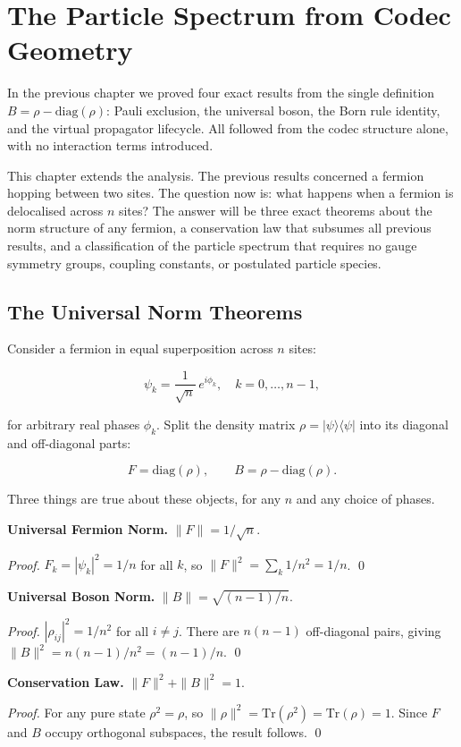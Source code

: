 \chapter{The Particle Spectrum from Codec Geometry}

In the previous chapter we proved four exact results from the single
definition $B = \rho - \mathrm{diag}(\rho)$: Pauli exclusion, the
universal boson, the Born rule identity, and the virtual propagator
lifecycle. All followed from the codec structure alone, with no
interaction terms introduced.

This chapter extends the analysis. The previous results concerned a
fermion hopping between two sites. The question now is: what happens
when a fermion is delocalised across $n$ sites? The answer will be
three exact theorems about the norm structure of any fermion, a
conservation law that subsumes all previous results, and a
classification of the particle spectrum that requires no gauge
symmetry groups, coupling constants, or postulated particle species.

\section{The Universal Norm Theorems}

Consider a fermion in equal superposition across $n$ sites:

\[
\psi_k = \frac{1}{\sqrt{n}}\,e^{i\phi_k}, \quad k = 0, \ldots, n-1,
\]

for arbitrary real phases $\phi_k$. Split the density matrix
$\rho = |\psi\rangle\langle\psi|$ into its diagonal and off-diagonal
parts:

\[
F = \mathrm{diag}(\rho), \qquad B = \rho - \mathrm{diag}(\rho).
\]

Three things are true about these objects, for any $n$ and any choice
of phases.

\textbf{Universal Fermion Norm.} $\|F\| = 1/\sqrt{n}$.

\textit{Proof.} $F_k = |\psi_k|^2 = 1/n$ for all $k$, so $\|F\|^2 =
\sum_k 1/n^2 = 1/n$. \qed

\textbf{Universal Boson Norm.} $\|B\| = \sqrt{(n-1)/n}$.

\textit{Proof.} $|\rho_{ij}|^2 = 1/n^2$ for all $i \neq j$. There
are $n(n-1)$ off-diagonal pairs, giving $\|B\|^2 = n(n-1)/n^2 =
(n-1)/n$. \qed

\textbf{Conservation Law.} $\|F\|^2 + \|B\|^2 = 1$.

\textit{Proof.} For any pure state $\rho^2 = \rho$, so
$\|\rho\|^2 = \mathrm{Tr}(\rho^2) = \mathrm{Tr}(\rho) = 1$. Since
$F$ and $B$ occupy orthogonal subspaces, the result follows. \qed

